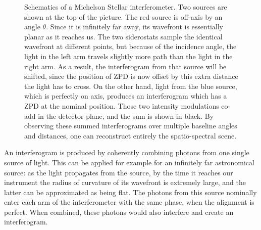 \begin{figure}[!h]
	\centering
	
	\caption[Michelson Stellar interferometer]{Schematics of a Michelson Stellar interferometer. Two sources are shown at the top of the picture. The red source is off-axis by an angle $\theta$. Since it is infinitely far away, its wavefront is essentially planar as it reaches us. The two siderostats sample the identical wavefront at different points, but because of the incidence angle, the light in the left arm travels slightly more path than the light in the right arm. As a result, the interferogram from that source will be shifted, since the position of ZPD is now offset by this extra distance the light has to cross. On the other hand, light from the blue source, which is perfectly on axis, produces an interferogram which has a ZPD at the nominal position. Those two intensity modulations co-add in the detector plane, and the sum is shown in black. By observing these summed interferograms over multiple baseline angles and distances, one can reconstruct entirely the spatio-spectral scene.}
	\label{fig:interferometer}
    \end{figure}


An interferogram is produced by coherently combining photons from one single source of light. This can be applied for example for an infinitely far astronomical source: as the light propagates from the source, by the time it reaches our instrument the radius of curvature of its wavefront is extremely large, and the latter can be approximated as being flat. The photons from this source nominally enter each arm of the interferometer with the same phase, when the alignment is perfect. When combined, these photons would also interfere and create an interferogram.

